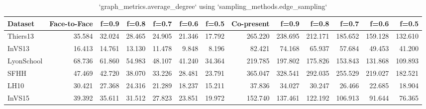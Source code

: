 \begin{table}[ht]
\begin{tabular}{lrrrrrrrrrrrr}
\hline
 Dataset    &   Face-to-Face &   f=0.9 &   f=0.8 &   f=0.7 &   f=0.6 &   f=0.5 &   Co-present &   f=0.9 &   f=0.8 &   f=0.7 &   f=0.6 &   f=0.5 \\
\hline
 Thiers13   &         35.584 &  32.024 &  28.465 &  24.905 &  21.346 &  17.792 &      265.220 & 238.695 & 212.171 & 185.652 & 159.128 & 132.610 \\
 InVS13     &         16.413 &  14.761 &  13.130 &  11.478 &   9.848 &   8.196 &       82.421 &  74.168 &  65.937 &  57.684 &  49.453 &  41.200 \\
 LyonSchool &         68.736 &  61.860 &  54.983 &  48.107 &  41.240 &  34.364 &      219.785 & 197.802 & 175.826 & 153.843 & 131.868 & 109.893 \\
 SFHH       &         47.469 &  42.720 &  38.070 &  33.226 &  28.481 &  23.791 &      365.047 & 328.541 & 292.035 & 255.529 & 219.027 & 182.521 \\
 LH10       &         30.421 &  27.368 &  24.316 &  21.289 &  18.237 &  15.211 &       37.836 &  34.027 &  30.247 &  26.466 &  22.685 &  18.904 \\
 InVS15     &         39.392 &  35.611 &  31.512 &  27.823 &  23.851 &  19.972 &      152.740 & 137.461 & 122.192 & 106.913 &  91.644 &  76.365 \\
\hline
\end{tabular}
\caption{`graph_metrics.average_degree` using `sampling_methods.edge_sampling`}
\end{table}